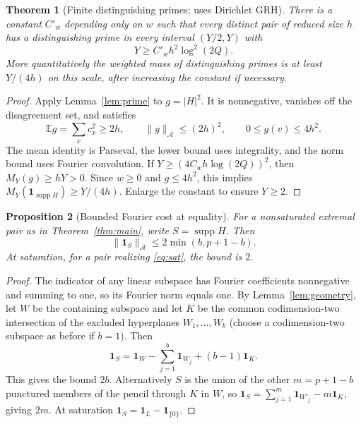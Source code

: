 \documentclass[11pt]{article}
\newtheorem{theorem}{Theorem}[section]
\newtheorem{proposition}[theorem]{Proposition}
\theoremstyle{remark}\newtheorem{remark}[theorem]{Remark}
\newcommand{\supp}{\operatorname{supp}}
\newcommand{\E}{\mathbb E}
\newcommand{\ind}{\mathbf 1}
\begin{document}
\begin{theorem}[Finite distinguishing primes; uses Dirichlet GRH]\label{thm:detect}
There is a constant $C'_w$ depending only on $w$ such that every distinct pair of reduced size $h$ has a distinguishing prime in every interval $(Y/2,Y)$ with
\[
 Y\ge C'_w h^2\log^2(2Q).
\]
More quantitatively the weighted mass of distinguishing primes is at least $Y/(4h)$ on this scale, after increasing the constant if necessary.
\end{theorem}
\begin{proof}
Apply Lemma~\ref{lem:prime} to $g=|H|^2$. It is nonnegative, vanishes off the disagreement set, and satisfies
\[
 \E g=\sum_x c_x^2\ge 2h,\qquad
 \|g\|_{\mathcal A}\le (2h)^2,\qquad 0\le g(v)\le4h^2.
\]
The mean identity is Parseval, the lower bound uses integrality, and the norm bound uses Fourier convolution. If $Y\ge (4C_w h\log(2Q))^2$, then $M_Y(g)\ge hY>0$. Since $w\ge0$ and $g\le4h^2$, this implies $M_Y(\ind_{\supp H})\ge Y/(4h)$. Enlarge the constant to ensure $Y\ge2$.
\end{proof}

\begin{proposition}[Bounded Fourier cost at equality]\label{prop:norm}
For a nonsaturated extremal pair as in Theorem~\ref{thm:main}, write $S=\supp H$. Then
\[
 \|\ind_S\|_{\mathcal A}\le 2\min(b,p+1-b).
\]
At saturation, for a pair realizing \eqref{eq:sat}, the bound is $2$.
\end{proposition}
\begin{proof}
The indicator of any linear subspace has Fourier coefficients nonnegative and summing to one, so its Fourier norm equals one. By Lemma~\ref{lem:geometry}, let $W$ be the containing subspace and let $K$ be the common codimension-two intersection of the excluded hyperplanes $W_1,\ldots,W_b$ (choose a codimension-two subspace as before if $b=1$). Then
\[
 \ind_S=\ind_W-\sum_{j=1}^b\ind_{W_j}+(b-1)\ind_K.
\]
This gives the bound $2b$. Alternatively $S$ is the union of the other $m=p+1-b$ punctured members of the pencil through $K$ in $W$, so $\ind_S=\sum_{j=1}^m\ind_{W'_j}-m\ind_K$, giving $2m$. At saturation $\ind_S=\ind_L-\ind_{\{0\}}$.
\end{proof}
\end{document}
